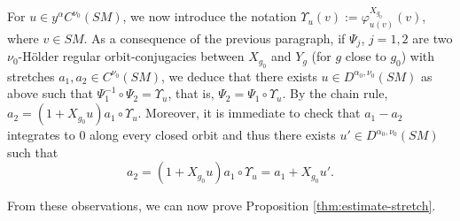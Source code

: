 \documentclass[10pt]{amsart}
\theoremstyle{plain}
\theoremstyle{definition}
\begin{document}
{\color{black}For $u \in y^\alpha C^{\nu_0}(SM)$, we now introduce the notation $\Upsilon_u(v) := \varphi^{X_{g_0}}_{u(v)}(v)$, where $v \in SM$. As a consequence of the previous paragraph,} if $\Psi_j$, $j=1,2$ are two $\nu_0$-Hölder regular orbit-conjugacies between $X_{g_0}$ and $Y_{g}$ (for $g$ close to $g_0$) with stretches $a_1, a_2 \in C^{\nu_0}(SM)$, we deduce that there exists $u \in D^{\alpha_0,\nu_0}(SM)$ as above such that $\Psi_1^{-1}\circ\Psi_2 = \Upsilon_{u}$, that is, $\Psi_2= \Psi_1 \circ \Upsilon_{u}$. By the chain rule, $a_2 = (1+X_{g_0} u) a_1\circ \Upsilon_{u}$. Moreover, it is immediate to check that $a_1-a_2$ integrates to $0$ along every closed orbit and thus there exists $u' \in D^{\alpha_0,\nu_0}(SM)$ such that
\begin{equation}
\label{equation:rem}
a_2 = (1+X_{g_0}u)a_1 \circ \Upsilon_u = a_1 + X_{g_0}u'.
\end{equation}

From these observations, we can now prove Proposition \ref{thm:estimate-stretch}.
\end{document}

